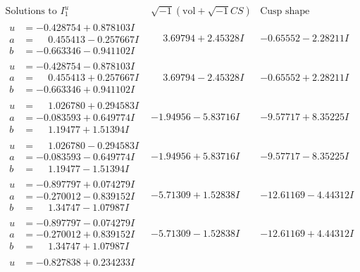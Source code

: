 \documentclass[1p]{elsarticle_modified}
\theoremstyle{definition}
\newcommand{\I}{\sqrt{-1}}
\begin{document}
$$\begin{array}{c|c|c}  
\text{Solutions to }I^u_{1}& \I (\text{vol} + \sqrt{-1}CS) & \text{Cusp shape}\\
 \hline 
\begin{aligned}
u &= -0.428754 + 0.878103 I \\
a &= \phantom{-}0.455413 - 0.257667 I \\
b &= -0.663346 - 0.941102 I\end{aligned}
 & \phantom{-}3.69794 + 2.45328 I & -0.65552 - 2.28211 I \\ \hline\begin{aligned}
u &= -0.428754 - 0.878103 I \\
a &= \phantom{-}0.455413 + 0.257667 I \\
b &= -0.663346 + 0.941102 I\end{aligned}
 & \phantom{-}3.69794 - 2.45328 I & -0.65552 + 2.28211 I \\ \hline\begin{aligned}
u &= \phantom{-}1.026780 + 0.294583 I \\
a &= -0.083593 + 0.649774 I \\
b &= \phantom{-}1.19477 + 1.51394 I\end{aligned}
 & -1.94956 - 5.83716 I & -9.57717 + 8.35225 I \\ \hline\begin{aligned}
u &= \phantom{-}1.026780 - 0.294583 I \\
a &= -0.083593 - 0.649774 I \\
b &= \phantom{-}1.19477 - 1.51394 I\end{aligned}
 & -1.94956 + 5.83716 I & -9.57717 - 8.35225 I \\ \hline\begin{aligned}
u &= -0.897797 + 0.074279 I \\
a &= -0.270012 - 0.839152 I \\
b &= \phantom{-}1.34747 - 1.07987 I\end{aligned}
 & -5.71309 + 1.52838 I & -12.61169 - 4.44312 I \\ \hline\begin{aligned}
u &= -0.897797 - 0.074279 I \\
a &= -0.270012 + 0.839152 I \\
b &= \phantom{-}1.34747 + 1.07987 I\end{aligned}
 & -5.71309 - 1.52838 I & -12.61169 + 4.44312 I \\ \hline\begin{aligned}
u &= -0.827838 + 0.234233 I \\

\end{aligned}
\end{array}$$
\end{document}
